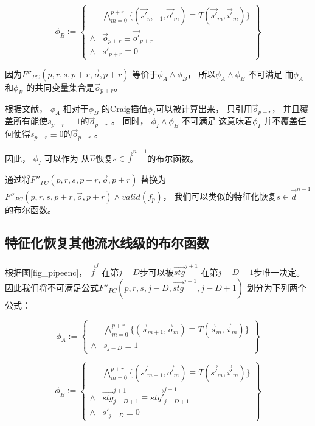 \begin{equation}
\phi_B :=
\left\{
\begin{array}{cc}
&\bigwedge_{m=0}^{p+r}
\{
(\vec{s'}_{m+1},\vec{o'}_m)\equiv T(\vec{s'}_m,\vec{i'}_m)
\}
\\
\wedge&\vec{o}_{p+r}\equiv \vec{o'}_{p+r} \\
\wedge& s'_{p+r}\equiv 0
\end{array}
\right\}
\end{equation}

因为$F''_{PC}(p,r,s,p+r,\vec{o},p+r)$ 等价于$\phi_A \wedge \phi_B$，
所以$\phi_A \wedge \phi_B$ 不可满足
而$\phi_A$ 和$\phi_B$ 的共同变量集合是$\vec{o}_{p+r}$。

根据文献，
$\phi_A$ 相对于$\phi_B$ 的Craig插值$\phi_I$可以被计算出来，
只引用$\vec{o}_{p+r}$，
并且覆盖所有能使$s_{p+r}\equiv 1$的$\vec{o}_{p+r}$ 。
同时，
$\phi_I\wedge \phi_B$ 不可满足
这意味着$\phi_I$ 并不覆盖任何使得$s_{p+r}\equiv 0$的$\vec{o}_{p+r}$ 。

因此，
$\phi_I$ 可以作为
从$\vec{o}$恢复$s\in \vec{f}^{n-1}$的布尔函数。

通过将$F''_{PC}(p,r,s,p+r,\vec{o},p+r)$ 替换为$F''_{PC}(p,r,s,p+r,\vec{o},p+r)\wedge valid(f_p)$，
我们可以类似的特征化恢复$s\in\vec{d}^{n-1}$的布尔函数。

\subsection{特征化恢复其他流水线级的布尔函数}
根据图\ref{fig_pipeenc}，
$\vec{f}^j$ 在第$j-D$步可以被$\vec{stg}^{j+1}$ 在第$j-D+1$步唯一决定。
因此我们将不可满足公式$F''_{PC}(p,r,s,j-D,\vec{stg}^{j+1},j-D+1)$
划分为下列两个公式：

\begin{equation}
 \phi_A :=
 \left\{
\begin{array}{cc}
&\bigwedge_{m=0}^{p+r}
\{
(\vec{s}_{m+1},\vec{o}_m)\equiv T(\vec{s}_m,\vec{i}_m)
\}
\\
\wedge& s_{j-D}\equiv 1
\end{array}
\right\}
\end{equation}

\begin{equation}
\phi_B :=
\left\{
\begin{array}{cc}
&\bigwedge_{m=0}^{p+r}
\{
(\vec{s'}_{m+1},\vec{o'}_m)\equiv T(\vec{s'}_m,\vec{i'}_m)
\}
\\
\wedge&\vec{stg}^{j+1}_{j-D+1}\equiv \vec{stg'}^{j+1}_{j-D+1} \\
\wedge& s'_{j-D}\equiv 0
\end{array}
\right\}
\end{equation}

